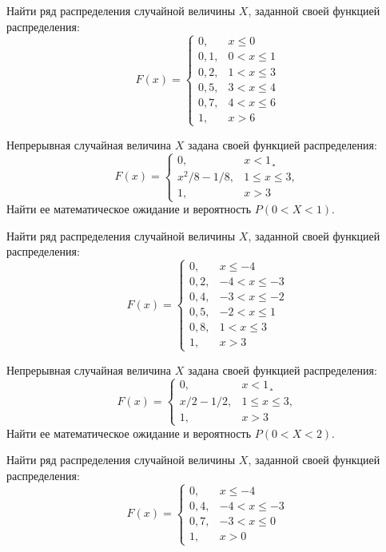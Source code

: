 \vfill

\newpage\setcounter{zad}{0}

\z Найти ряд распределения случайной величины $X$, заданной своей функцией распределения: $$ F(x) = \begin{cases}0, & x \leqslant 0 \\ 0{,}1, & 0 < x \leqslant 1 \\ 0{,}2, & 1 < x \leqslant 3 \\ 0{,}5, & 3 < x \leqslant 4 \\ 0{,}7, & 4 < x \leqslant 6 \\ 1, & x > 6 \end{cases} $$


\vfill

\z Непрерывная случайная величина $X$ задана своей функцией распределения: $$ F(x) = \begin{cases}0, & x < 1¸\\ x^2/8-1/8, & 1 \leqslant x \leqslant 3, \\ 1, & x > 3 \end{cases} $$ Найти ее математическое ожидание и вероятность $P(0 < X < 1)$.
 

\vfill

\newpage\setcounter{zad}{0}

\z Найти ряд распределения случайной величины $X$, заданной своей функцией распределения: $$ F(x) = \begin{cases}0, & x \leqslant -4 \\ 0{,}2, & -4 < x \leqslant -3 \\ 0{,}4, & -3 < x \leqslant -2 \\ 0{,}5, & -2 < x \leqslant 1 \\ 0{,}8, & 1 < x \leqslant 3 \\ 1, & x > 3 \end{cases} $$


\vfill

\z Непрерывная случайная величина $X$ задана своей функцией распределения: $$ F(x) = \begin{cases}0, & x < 1¸\\ x/2-1/2, & 1 \leqslant x \leqslant 3, \\ 1, & x > 3 \end{cases} $$ Найти ее математическое ожидание и вероятность $P(0 < X < 2)$.
 

\vfill

\newpage\setcounter{zad}{0}

\z Найти ряд распределения случайной величины $X$, заданной своей функцией распределения: $$ F(x) = \begin{cases}0, & x \leqslant -4 \\ 0{,}4, & -4 < x \leqslant -3 \\ 0{,}7, & -3 < x \leqslant 0 \\ 1, & x > 0 \end{cases} $$


